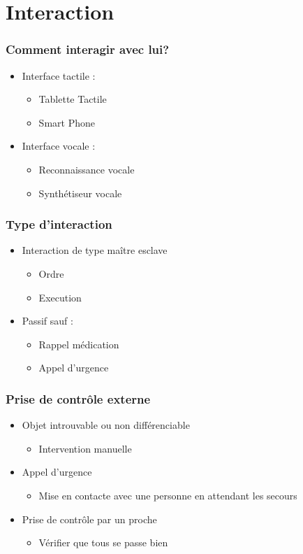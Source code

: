 \section{Interaction}
\begin{frame}
  \frametitle{Comment interagir avec lui?}
      	\begin{itemize}
      	\item Interface tactile :
        	\begin{itemize}
        	\item Tablette Tactile
        	\item Smart Phone 
        	\end{itemize}
	\item Interface vocale :
		\begin{itemize}
		\item Reconnaissance vocale
		\item Synthétiseur vocale
		\end{itemize}
      \end{itemize}
\end{frame}

\begin{frame}
	\frametitle{Type d'interaction}
	\begin{itemize}
	\item Interaction de type maître esclave
		\begin{itemize}
		\item Ordre
		\item Execution
		\end{itemize}
	\item Passif sauf :
		\begin{itemize}
		\item Rappel médication
		\item Appel d'urgence
		\end{itemize}
	\end{itemize}
\end{frame}

\begin{frame}
	\frametitle{Prise de contrôle externe}
	\begin{itemize}
	\item Objet introuvable ou non différenciable
		\begin{itemize}
		\item Intervention manuelle
		\end{itemize}
	\item Appel d'urgence
		\begin{itemize}
		\item Mise en contacte avec une personne en attendant les secours
		\end{itemize}
	\item Prise de contrôle par un proche
		\begin{itemize}
		\item Vérifier que tous se passe bien
		\end{itemize}
	\end{itemize}
\end{frame}
